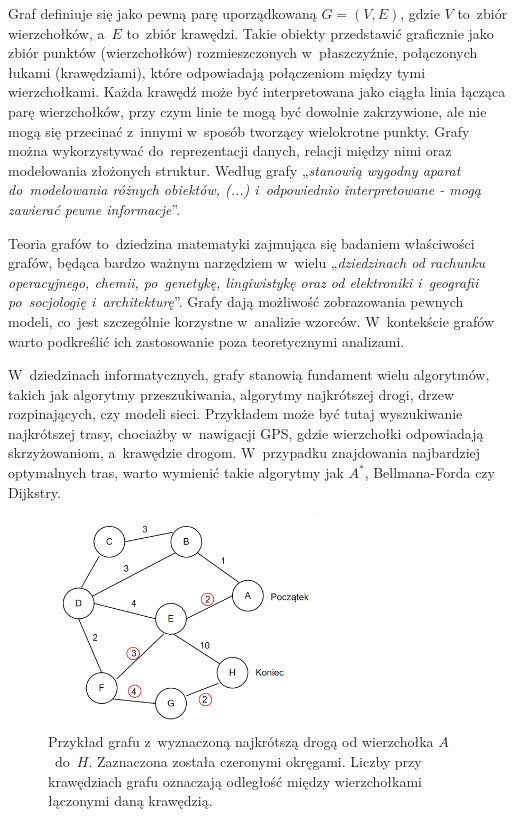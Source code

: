 Graf definiuje się jako pewną parę uporządkowaną $G = (V, E)$, gdzie $V$ to~zbiór wierzchołków,
a~$E$ to~zbiór krawędzi.
Takie obiekty przedstawić graficznie jako zbiór punktów (wierzchołków) rozmieszczonych w~płaszczyźnie,
połączonych łukami (krawędziami), które odpowiadają połączeniom między tymi wierzchołkami.
Każda krawędź może być interpretowana jako ciągła linia łącząca parę wierzchołków,
przy czym linie te mogą być dowolnie zakrzywione,
ale nie mogą się przecinać z~innymi w~sposób tworzący wielokrotne punkty.
Grafy można wykorzystywać do~reprezentacji danych, relacji między nimi oraz modelowania złożonych struktur.
Według \cite{Wloch2008} grafy „\textit{stanowią wygodny aparat do~modelowania różnych obiektów, (...) i~odpowiednio interpretowane
- mogą zawierać pewne informacje}”.

Teoria grafów to~dziedzina matematyki zajmująca się badaniem właściwości grafów,
będąca bardzo ważnym narzędziem w~wielu „\textit{dziedzinach od rachunku operacyjnego, chemii, po~genetykę, lingiwistykę
oraz od elektroniki i~geografii po~socjologię i~architekturę}”\cite{Wilson2012}.
Grafy dają możliwość zobrazowania pewnych modeli, co~jest szczególnie korzystne w~analizie wzorców.
W~kontekście grafów warto podkreślić ich zastosowanie poza teoretycznymi analizami.

W~dziedzinach informatycznych, grafy stanowią fundament wielu algorytmów, takich jak algorytmy przeszukiwania,
algorytmy najkrótszej drogi, drzew rozpinających, czy modeli sieci.
Przykładem może być tutaj wyszukiwanie najkrótszej trasy, chociażby w~nawigacji GPS,
gdzie wierzchołki odpowiadają skrzyżowaniom, a~krawędzie drogom.
W~przypadku znajdowania najbardziej optymalnych tras, warto wymienić takie algorytmy jak $A^*$, Bellmana-Forda czy Dijkstry.

\begin{figure}[ht]
	\centering
	\includegraphics[height=5.6cm]{resources/introduction/images/shortest_path.png}
	\caption{Przykład grafu z~wyznaczoną najkrótszą drogą od wierzchołka $A$~do~$H$.
		Zaznaczona została czeronymi okręgami.
		Liczby przy krawędziach grafu oznaczają odległość między wierzchołkami łączonymi daną krawędzią.}
    \label{Fig:intro-1}
\end{figure}
\FloatBarrier

